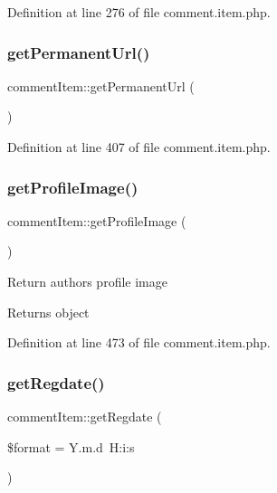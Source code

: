 Definition at line 276 of file comment.\+item.\+php.

\mbox{\label{classcommentItem_adc6e6a36fd7c02a2f0fecc8a22f9b13b}} 
\subsubsection{\texorpdfstring{get\+Permanent\+Url()}{getPermanentUrl()}}
{\footnotesize\ttfamily comment\+Item\+::get\+Permanent\+Url (\begin{DoxyParamCaption}{ }\end{DoxyParamCaption})}



Definition at line 407 of file comment.\+item.\+php.

\mbox{\label{classcommentItem_a9baa56f4aa9515c433494778e75c9e85}} 
\subsubsection{\texorpdfstring{get\+Profile\+Image()}{getProfileImage()}}
{\footnotesize\ttfamily comment\+Item\+::get\+Profile\+Image (\begin{DoxyParamCaption}{ }\end{DoxyParamCaption})}

Return author\textquotesingle{}s profile image \begin{DoxyReturn}{Returns}
object 
\end{DoxyReturn}


Definition at line 473 of file comment.\+item.\+php.

\mbox{\label{classcommentItem_ac20123f19deb94ad33a26366195b2477}} 
\subsubsection{\texorpdfstring{get\+Regdate()}{getRegdate()}}
{\footnotesize\ttfamily comment\+Item\+::get\+Regdate (\begin{DoxyParamCaption}\item[{}]{\$format = {\ttfamily \textquotesingle{}Y.m.d~H\+:i\+:s\textquotesingle{}} }\end{DoxyParamCaption})}



